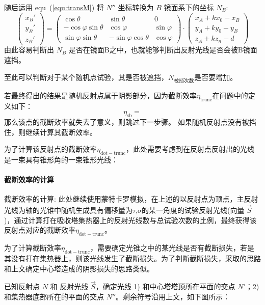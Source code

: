 \documentclass[../main.tex]{subfiles}
\begin{document}
随后运用 equ~(\ref{equ:transM}) 将 \(N''\) 坐标转换为 \(B\) 镜面系下的坐标 \(N_{B}\):
\[
\begin{pmatrix}
x_{B} '\\
y_{B} '\\
z _{B} '
\end{pmatrix}
=
\begin{pmatrix}
\cos \theta & \sin \theta & 0\\
-\cos \varphi \sin \theta & \cos \varphi & \sin \varphi \\
\sin \varphi \sin \theta & - \sin \varphi \cos \theta & \cos \varphi
\end{pmatrix}
\cdot
\begin{pmatrix}
x_{A} + kx_0 - x_{B}\\
y_{A} + ky_{0} - y_{B}\\
z_{A} + kz_{n} - d
\end{pmatrix}
\]
由此容易判断出 \(N_{B}\) 是否在镜面B之中，也就能够判断出反射光线是否会被B镜面遮挡。

至此可以判断对于某个随机点试验，其是否被遮挡，\(N_{\text{被挡次数}}\)是否要增加。

若最终得出的结果是随机反射点属于阴影部分，因为截断效率\(\eta _{\mathrm{trunc}}\)在问题中的定义如下：
\begin{equation}
\eta _{\mathrm{s b}} =
\end{equation}
那么该点的截断效率就失去了意义，则跳过下一步骤。
如果随机反射点没有被挡住，则继续计算其截断效率。

为了计算该反射点的截断效率\(\eta _{\mathrm{dot}{-}\mathrm{trunc}}\)，此处需要考虑到在反射点反射出的光线是一束具有锥形角的一束锥形光线：

\paragraph{截断效率的计算}
截断效率的计算: 此处继续使用蒙特卡罗模拟，在上述的以反射点为顶点，主反射光线为轴的光锥中随机生成具有偏移量为\(\tau\),\(\sigma\)的某一角度的试验反射光线(向量 \(\vec S\))，通过计算打在吸收塔集热器上的反射光线数与总试验次数的比例，最终获得该反射点对应的截断效率\(\eta _{\mathrm{dot}{-}\mathrm{trunc}}\)。

为了计算截断效率\(\eta _{\mathrm{dot-trunc}}\)，需要确定光锥之中的某光线是否有截断损失，若是其没有打在集热器上，则该光线发生了截断损失。为了判断截断损失，采取的思路和上文确定中心塔造成的阴影损失的思路类似。

已知反射点 \(N\) 和 反射光线 \(\vec S\)，确定光线 1) 和中心塔塔顶所在平面的交点 \(N'\)；2) 和集热器底部所在的平面的交点 \(N''\)。剩余符号沿用上文，如下图所示：
\end{document}
